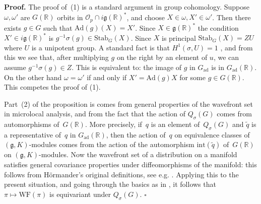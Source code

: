 \documentclass[10pt,leqno]{article}
\newcommand{\qed}{\hfill $\square$ \medskip}
\newenvironment{proof}[1][Proof]{\noindent\textbf{#1.} }{\qed}
\newcommand{\Ad}{\mathrm{Ad}}
\newcommand{\Gad}{G_\mathrm{ad}}
\newcommand{\Stab}{\mathrm{Stab}}
\renewcommand{\O}{\mathcal O}
\newcommand{\R}{\mathbb R}
\newcommand{\g}{\mathfrak g}
\newcommand\inv{^{-1}}
\newcommand{\WF}{\mathrm{WF}}
\newcommand{\Op}{\O_p}
\begin{document}
\begin{proof}
The proof of~(1) is a standard argument in group cohomology. Suppose $\omega,\omega'$ are $G(\R)$ orbits in $\Op\cap i\g(\R)^*$,
and choose $X\in \omega,X'\in\omega'$. Then there exists $g\in G$ such that $\Ad(g)(X)=X'$. Since $X\in \g(\R)^*$ the condition $X'\in i\g(\R)^*$ 
is $g\inv \sigma(g)\in \Stab_G(X)$.  Since $X$ is principal $\Stab_G(X)=ZU$ where $U$ is a unipotent group. 
A standard fact is that $H^1(\sigma, U)=1$ \cite[Chap.~III, Proposition~6]{Serre_Galois}, and from this we see that, after multiplying $g$ on the right by an element of $u$, we can assume $g\inv \sigma(g)\in Z$. This is equivalent to: the image of $g$ in $\Gad$ is in $\Gad(\R)$. On the other hand $\omega=\omega'$ 
if and only if $X'=\Ad(g)X$ for some $g\in G(\R)$. This competes the proof of (1).

Part~(2) of the proposition is comes from general properties of the wavefront set in microlocal analysis, and from the fact that the action of $Q_{\sigma}(G)$ comes from automorphisms of~$G(\R)$. More precisely, if~$q$ is an element of~$Q_{\sigma}(G)$ and $\tilde{q}$ is a representative of~$q$ in $\Gad(\R)$, then the action of~$q$ on equivalence classes of $(\g, K)$-modules comes from the action of the automorphism $\mathrm{int}(\tilde{q})$ of~$G(\R)$ on $(\g, K)$-modules. Now the wavefront set of a distribution on a manifold satisfies general covariance properties under diffeomorphisms of the manifold: this follows from Hörmander's original definitions, see e.g. \cite[Section 2, p.~800]{HarrisHeOlafsson}. Applying this to the present situation, and going through the basics as in   \cite[Section~2]{HarrisHeOlafsson}, it follows that $\pi \mapsto \WF(\pi)$ is equivariant under $Q_{\sigma}(G)$.
\end{proof}
\end{document}
